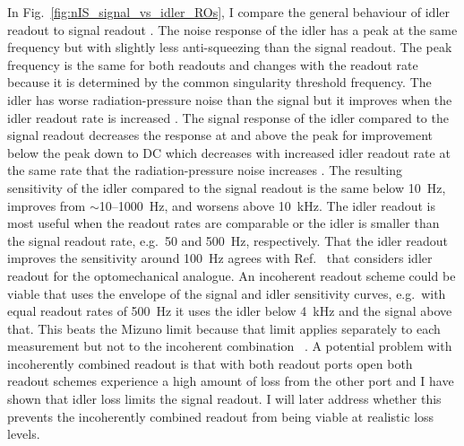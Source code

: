 In Fig.~\ref{fig:nIS_signal_vs_idler_ROs}, I compare the general behaviour of idler readout to signal readout . The noise response of the idler has a peak at the same frequency but with slightly less anti-squeezing  than the signal readout. The peak frequency is the same for both readouts and changes with the readout rate because it is determined by the common singularity threshold frequency. The idler has worse radiation-pressure noise than the signal  but it improves when the idler readout rate is increased . The signal response of the idler compared to the signal readout decreases the response at and above the peak for improvement below the peak down to DC which decreases with increased idler readout rate at the same rate that the radiation-pressure noise increases .
The resulting sensitivity of the idler compared to the signal readout is the same below 10~Hz, improves from $\sim$10--1000~Hz, and worsens above 10~kHz. The idler readout is most useful when the readout rates are comparable or the idler is smaller than the signal readout rate, e.g.\ 50 and 500~Hz, respectively. 
That the idler readout improves the sensitivity around 100~Hz agrees with Ref.~\cite{Li2021} that considers idler readout for the optomechanical analogue.
An incoherent readout scheme could be viable that uses the envelope of the signal and idler sensitivity curves, e.g.\ with equal readout rates of 500~Hz it uses the idler below 4~kHz and the signal above that. This beats the Mizuno limit because that limit applies separately to each measurement but not to the incoherent combination ~\cite{}. A potential problem with incoherently combined readout is that with both readout ports open both readout schemes experience a high amount of loss from the other port and I have shown that idler loss limits the signal readout. I will later address whether this prevents the incoherently combined readout from being viable at realistic loss levels. 


